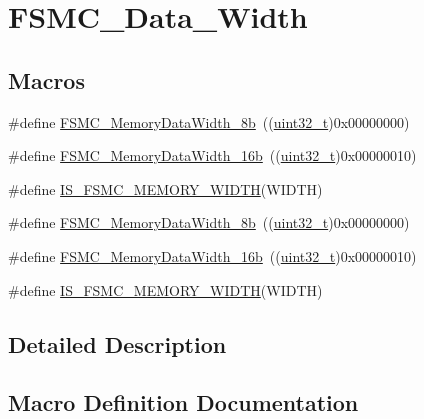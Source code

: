 \hypertarget{group___f_s_m_c___data___width}{}\section{F\+S\+M\+C\+\_\+\+Data\+\_\+\+Width}
\label{group___f_s_m_c___data___width}
\subsection*{Macros}
\begin{DoxyCompactItemize}
\item 
\#define \hyperlink{group___f_s_m_c___data___width_ga5753e089830f19af70a724766e3c329f}{F\+S\+M\+C\+\_\+\+Memory\+Data\+Width\+\_\+8b}~((\hyperlink{_p_e___types_8h_a33594304e786b158f3fb30289278f5af}{uint32\+\_\+t})0x00000000)
\item 
\#define \hyperlink{group___f_s_m_c___data___width_ga65d85c3072e6790ae760ca2248e46df6}{F\+S\+M\+C\+\_\+\+Memory\+Data\+Width\+\_\+16b}~((\hyperlink{_p_e___types_8h_a33594304e786b158f3fb30289278f5af}{uint32\+\_\+t})0x00000010)
\item 
\#define \hyperlink{group___f_s_m_c___data___width_ga003d52b62f5950fb041f73f15ce20171}{I\+S\+\_\+\+F\+S\+M\+C\+\_\+\+M\+E\+M\+O\+R\+Y\+\_\+\+W\+I\+D\+TH}(W\+I\+D\+TH)
\item 
\#define \hyperlink{group___f_s_m_c___data___width_ga5753e089830f19af70a724766e3c329f}{F\+S\+M\+C\+\_\+\+Memory\+Data\+Width\+\_\+8b}~((\hyperlink{_p_e___types_8h_a33594304e786b158f3fb30289278f5af}{uint32\+\_\+t})0x00000000)
\item 
\#define \hyperlink{group___f_s_m_c___data___width_ga65d85c3072e6790ae760ca2248e46df6}{F\+S\+M\+C\+\_\+\+Memory\+Data\+Width\+\_\+16b}~((\hyperlink{_p_e___types_8h_a33594304e786b158f3fb30289278f5af}{uint32\+\_\+t})0x00000010)
\item 
\#define \hyperlink{group___f_s_m_c___data___width_ga003d52b62f5950fb041f73f15ce20171}{I\+S\+\_\+\+F\+S\+M\+C\+\_\+\+M\+E\+M\+O\+R\+Y\+\_\+\+W\+I\+D\+TH}(W\+I\+D\+TH)
\end{DoxyCompactItemize}


\subsection{Detailed Description}


\subsection{Macro Definition Documentation}
